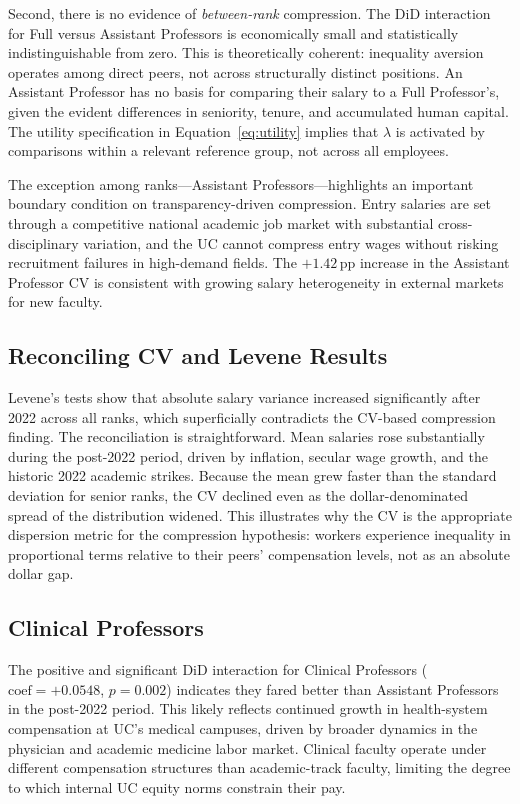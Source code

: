 \documentclass[12pt]{article}
\begin{document}
Second, there is no evidence of \emph{between-rank} compression. The DiD
interaction for Full versus Assistant Professors is economically small
and statistically indistinguishable from zero. This is theoretically
coherent: inequality aversion operates among direct peers, not across
structurally distinct positions. An Assistant Professor has no basis for
comparing their salary to a Full Professor's, given the evident
differences in seniority, tenure, and accumulated human capital. The
utility specification in Equation~\eqref{eq:utility} implies that
$\lambda$ is activated by comparisons within a relevant reference group,
not across all employees.

The exception among ranks---Assistant Professors---highlights an
important boundary condition on transparency-driven compression. Entry
salaries are set through a competitive national academic job market with
substantial cross-disciplinary variation, and the UC cannot compress
entry wages without risking recruitment failures in high-demand fields.
The $+1.42$\,pp increase in the Assistant Professor CV is consistent
with growing salary heterogeneity in external markets for new faculty.

\subsection{Reconciling CV and Levene Results}

Levene's tests show that absolute salary variance increased significantly
after 2022 across all ranks, which superficially contradicts the
CV-based compression finding. The reconciliation is straightforward.
Mean salaries rose substantially during the post-2022 period, driven by
inflation, secular wage growth, and the historic 2022 academic strikes.
Because the mean grew faster than the standard deviation for senior
ranks, the CV declined even as the dollar-denominated spread of the
distribution widened. This illustrates why the CV is the appropriate
dispersion metric for the compression hypothesis: workers experience
inequality in proportional terms relative to their peers' compensation
levels, not as an absolute dollar gap.

\subsection{Clinical Professors}

The positive and significant DiD interaction for Clinical Professors
($\text{coef} = +0.0548$, $p = 0.002$) indicates they fared better than
Assistant Professors in the post-2022 period. This likely reflects
continued growth in health-system compensation at UC's medical campuses,
driven by broader dynamics in the physician and academic medicine labor
market. Clinical faculty operate under different compensation structures
than academic-track faculty, limiting the degree to which internal UC
equity norms constrain their pay.
\end{document}
